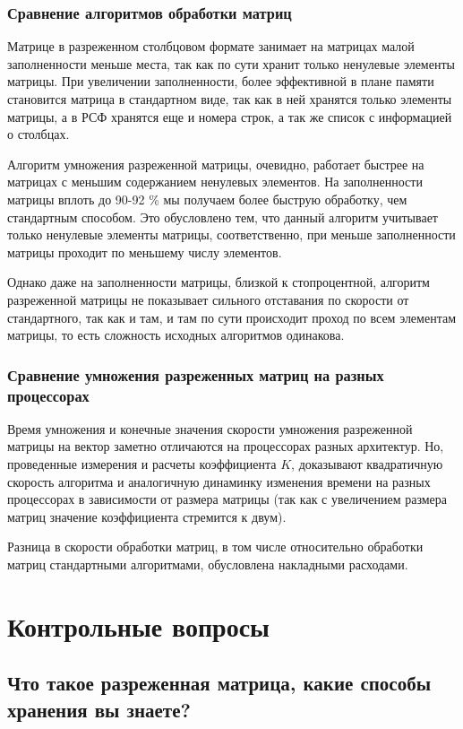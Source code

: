 \documentclass[a4paper,12pt]{extarticle}
\begin{document}
\subsubsection{Сравнение алгоритмов обработки матриц}

Матрице в разреженном столбцовом формате занимает на матрицах малой заполненности меньше места, так как по сути хранит только ненулевые элементы матрицы. При увеличении заполненности, более эффективной в плане памяти становится матрица в стандартном виде, так как в ней хранятся только элементы матрицы, а в РСФ хранятся еще и номера строк, а так же список с информацией о столбцах.

Алгоритм умножения разреженной матрицы, очевидно, работает быстрее на матрицах с меньшим содержанием ненулевых элементов. На заполненности матрицы вплоть до 90-92 \% мы получаем более быструю обработку, чем стандартным способом. Это обусловлено тем, что данный алгоритм учитывает только ненулевые элементы матрицы, соответственно, при меньше заполненности матрицы проходит по меньшему числу элементов.

Однако даже на заполненности матрицы, близкой к стопроцентной, алгоритм разреженной матрицы не показывает сильного отставания по скорости от стандартного, так как и там, и там по сути происходит проход по всем элементам матрицы, то есть сложность исходных алгоритмов одинакова.

\subsubsection{Сравнение умножения разреженных матриц на разных процессорах}

Время умножения и конечные значения скорости умножения разреженной матрицы на вектор заметно отличаются на процессорах разных архитектур. Но, проведенные измерения и расчеты коэффициента $K$, доказывают квадратичную скорость алгоритма и аналогичную динаминку изменения времени на разных процессорах в зависимости от размера матрицы (так как с увеличением размера матриц значение коэффициента стремится к двум).

Разница в скорости обработки матриц, в том числе относительно обработки матриц стандартными алгоритмами, обусловлена накладными расходами.


\newpage


\section{Контрольные вопросы}
\subsection{Что такое разреженная матрица, какие способы хранения вы знаете?}
\end{document}
